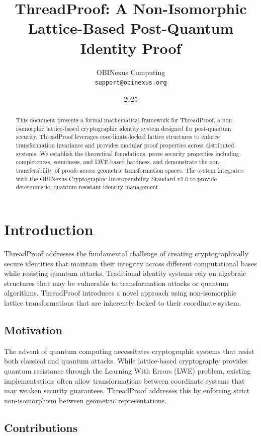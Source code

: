 \documentclass[11pt]{article}
\title{ThreadProof: A Non-Isomorphic Lattice-Based Post-Quantum Identity Proof}
\author{OBINexus Computing\\
\texttt{support@obinexus.org}}
\date{2025}
\theoremstyle{definition}
\begin{document}
\maketitle

\begin{abstract}
This document presents a formal mathematical framework for ThreadProof, a non-isomorphic lattice-based cryptographic identity system designed for post-quantum security. ThreadProof leverages coordinate-locked lattice structures to enforce transformation invariance and provides modular proof properties across distributed systems. We establish the theoretical foundations, prove security properties including completeness, soundness, and LWE-based hardness, and demonstrate the non-transferability of proofs across geometric transformation spaces. The system integrates with the OBINexus Cryptographic Interoperability Standard v1.0 to provide deterministic, quantum-resistant identity management.
\end{abstract}

\section{Introduction}

ThreadProof addresses the fundamental challenge of creating cryptographically secure identities that maintain their integrity across different computational bases while resisting quantum attacks. Traditional identity systems rely on algebraic structures that may be vulnerable to transformation attacks or quantum algorithms. ThreadProof introduces a novel approach using non-isomorphic lattice transformations that are inherently locked to their coordinate system.

\subsection{Motivation}

The advent of quantum computing necessitates cryptographic systems that resist both classical and quantum attacks. While lattice-based cryptography provides quantum resistance through the Learning With Errors (LWE) problem, existing implementations often allow transformations between coordinate systems that may weaken security guarantees. ThreadProof addresses this by enforcing strict non-isomorphism between geometric representations.

\subsection{Contributions}
\end{document}
